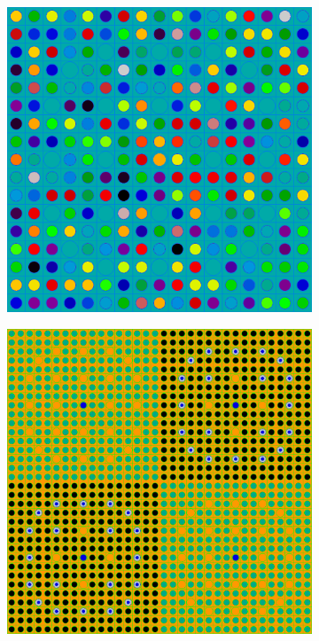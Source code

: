 \begin{figure}[h!]
\begin{subfigure}{.5\textwidth}
  \includegraphics[width=0.9\linewidth]{figures/quantification/homogenization/assm-16-degenerate-materials}
  \caption{}
  \label{fig:chap8-assm-16-degenerate-materials}
\end{subfigure}
\begin{subfigure}{.5\textwidth}
  \centering
  \includegraphics[width=0.9\linewidth]{figures/quantification/homogenization/2x2-null-materials}

\end{subfigure}
\end{figure}
